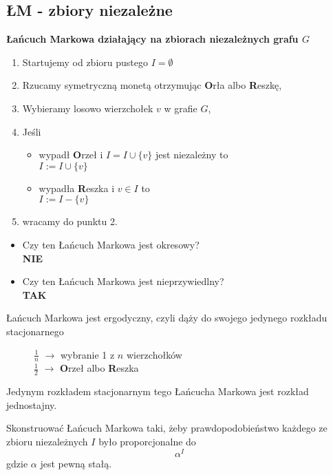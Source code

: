 \subsection{ŁM - zbiory niezależne}
\textbf{Łańcuch Markowa działający na zbiorach niezależnych grafu $G$}
\begin{enumerate}
\item Startujemy od zbioru pustego $I=\emptyset $
\item Rzucamy symetryczną monetą otrzymując \textbf{O}rła albo \textbf{R}eszkę,
\item Wybieramy losowo wierzchołek $v$ w grafie $G$,
\item Jeśli 
\begin{itemize}
\item[] wypadł \textbf{O}rzeł i $I=I\cup \{v\}$ jest niezależny to\\
$I:=I\cup \{v\}$
\item[] wypadła \textbf{R}eszka i $v\in I$ to\\
$I:=I- \{v\}$
\end{itemize}
\item wracamy do punktu 2.
\end{enumerate}
\begin{itemize}
\item Czy ten Łańcuch Markowa jest okresowy?\\\textbf{NIE}
\item Czy ten Łańcuch Markowa jest nieprzywiedlny?\\\textbf{TAK}
\end{itemize}
Łańcuch Markowa jest ergodyczny, czyli dąży do swojego jedynego rozkładu stacjonarnego

\begin{figure}[H]
\centering
{}
\caption*{$\frac{1}{n}$ $\rightarrow$ wybranie 1 z $n$ wierzchołków\\$\frac{1}{2}$ $\rightarrow$ \textbf{O}rzeł albo \textbf{R}eszka}
\end{figure}
\begin{remark}
Jedynym rozkładem stacjonarnym tego Łańcucha Markowa jest rozkład jednostajny.
\end{remark}
\begin{problem*}
Skonstruować Łańcuch Markowa taki, żeby prawdopodobieństwo każdego ze zbioru niezależnych $I$ było proporcjonalne do $$\alpha ^I$$ gdzie $\alpha $ jest pewną stałą.
\end{problem*}

